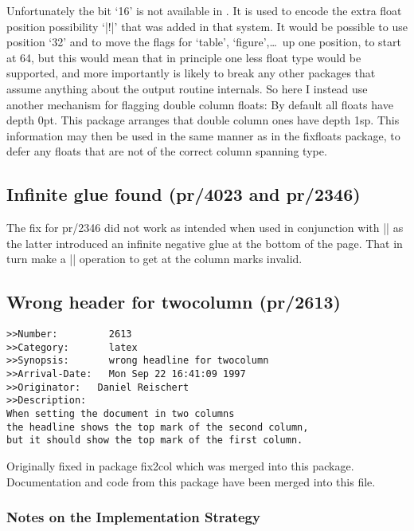 \documentclass{ltxguide}
\newcommand\Lpack[1]{\mbox{\textsf{#1}}}
\begin{document}
Unfortunately the bit `16' is not available in \LaTeXe. It is used
to encode the extra float position possibility `|!|' that was added
in that system. It would be possible to use position `32' and to
move the flags for `table', `figure',\ldots\ up one position, to
start at 64, but this would mean that in principle one less float
type would be supported, and more importantly is likely to break
any other packages that assume anything about the output routine
internals. So here I instead use another mechanism for flagging
double column floats: By default all floats have depth 0pt.
This package arranges that double column ones have depth 1sp.
This information may then be used in the same manner as in
the \Lpack{fixfloats} package, to defer any floats that are not of
the correct column spanning type.



\subsection{Infinite glue found (pr/4023 and pr/2346)}

The fix for pr/2346 did not work as intended when used in conjunction
with |\enlargethispage| as the latter introduced an infinite negative
glue at the bottom of the page. That in turn make a |\vsplit|
operation to get at the column marks invalid.

\subsection{Wrong header for twocolumn (pr/2613)}

\begin{verbatim}
>>Number:         2613
>>Category:       latex
>>Synopsis:       wrong headline for twocolumn
>>Arrival-Date:   Mon Sep 22 16:41:09 1997
>>Originator:   Daniel Reischert
>>Description:
When setting the document in two columns
the headline shows the top mark of the second column,
but it should show the top mark of the first column.
\end{verbatim}

Originally fixed in package \Lpack{fix2col} which was merged into
this package. Documentation and code from this package have been
merged into this file.

\subsubsection{Notes on the Implementation Strategy}
\end{document}
